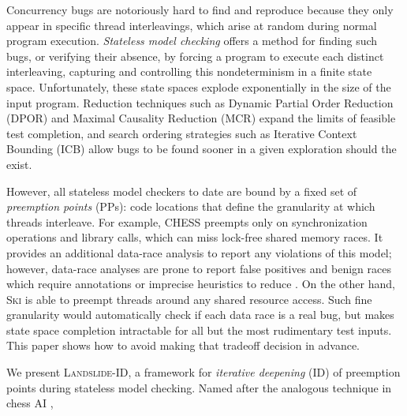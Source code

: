 \documentclass[pldi]{sigplanconf-pldi15}
\begin{document}
Concurrency bugs are notoriously hard to find and reproduce because they only appear in specific thread interleavings, which arise at random during normal program execution.
{\em Stateless model checking} \cite{verisoft} offers a method for finding such bugs,
or verifying their absence,
by forcing a program to execute each distinct interleaving,
capturing and controlling this nondeterminism in a finite state space.
Unfortunately, these state spaces explode exponentially in the size of the input program.
Reduction techniques such as Dynamic Partial Order Reduction (DPOR) \cite{dpor} and Maximal Causality Reduction (MCR) \cite{mcr} expand the limits of feasible test completion,
and search ordering strategies such as Iterative Context Bounding (ICB) \cite{chess} allow bugs to be found sooner in a given exploration should the exist.

However, all stateless model checkers to date are bound by a fixed set of {\em preemption points} (PPs): code locations that define the granularity at which threads interleave.
For example, \textsc{CHESS} \cite{chess} preempts only on synchronization operations and library calls, which can miss lock-free shared memory races.
It provides an additional data-race analysis to report any violations of this model;
however, data-race analyses are prone to report false positives and benign races which require annotations or imprecise heuristics to reduce \cite{racerx,tsan,datacollider}.
%
On the other hand,
\textsc{Ski} \cite{ski}
is able to preempt threads around any shared resource access. Such fine granularity would automatically check if each data race is a real bug, but makes state space completion intractable for all but the most rudimentary test inputs.
%
This paper shows how to avoid making that tradeoff decision in advance.

\newcommand\landslideid{\textsc{Landslide-ID}}
We present \landslideid, a framework for {\em iterative deepening} (ID) of preemption points during stateless model checking.
Named after the analogous technique in chess AI \cite{iterative-deepening-chess},
\end{document}
